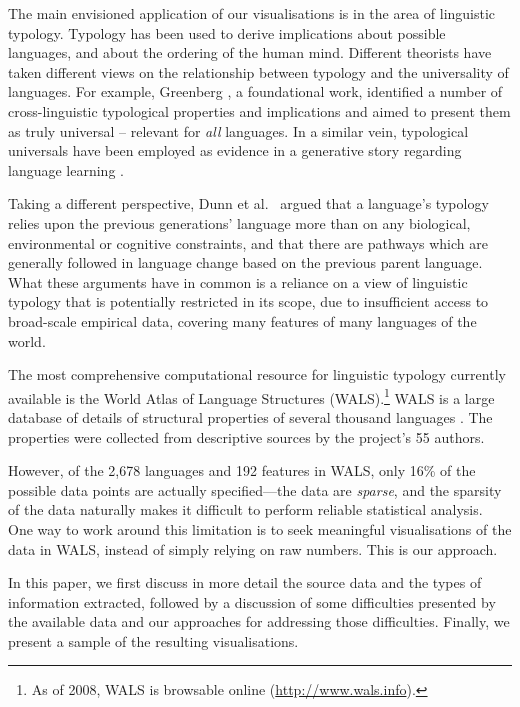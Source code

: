\documentclass[11pt]{article}
\begin{document}
The main envisioned application of our visualisations is in the area of linguistic typology. Typology has been used to derive implications about possible languages, and about the ordering of the human mind. Different theorists have taken different views on the relationship between typology and the universality of languages. For example, Greenberg , a foundational work, identified a number of cross-linguistic typological properties and implications and aimed to present them as truly universal -- relevant for \textit{all} languages. In a similar vein, typological universals have been employed as evidence in a generative story regarding language learning \cite{chomsky}.

Taking a different perspective, Dunn et al.\  argued that a language's typology relies upon the previous generations' language more than on any biological, environmental or cognitive constraints, and that there are pathways which are generally followed in language change based on the previous parent language. What these arguments have in common is a reliance on a view of linguistic typology that is potentially restricted in its scope, due to insufficient access to broad-scale empirical data, covering many features of many languages of the world. 

The most comprehensive computational resource for linguistic typology currently available is the World Atlas of Language Structures (WALS).\footnote{As of 2008, WALS is browsable online (\url{http://www.wals.info}).}  WALS is a large database of details of structural properties of several thousand languages \cite{wals-2011}. The properties were collected from descriptive sources by the project's 55 authors.

However, of the 2,678 languages and 192 features in WALS, only 16\% of the possible data points are actually specified---the data are \emph{sparse}, and the sparsity of the data naturally makes it difficult to perform reliable statistical analysis. One way to work around this limitation is to seek meaningful visualisations of the data in WALS, instead of simply relying on raw numbers. This is our approach. 

In this paper, we first discuss in more detail the source data and the types of information extracted, followed by a discussion of some difficulties presented by the available data and our approaches for addressing those difficulties. Finally, we present a sample of the resulting visualisations.
\end{document}
